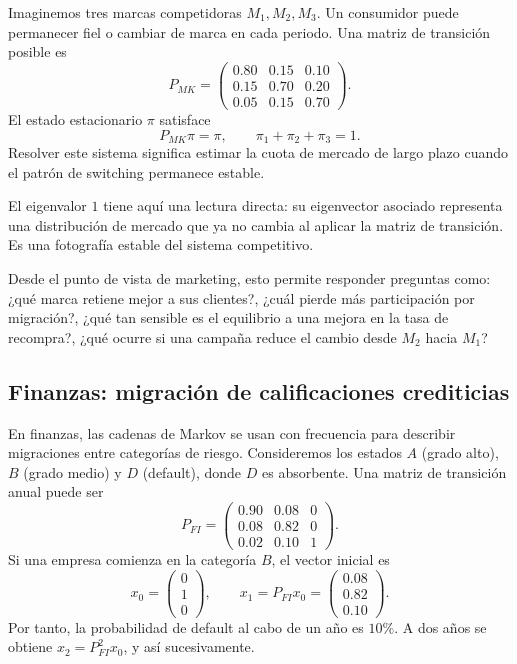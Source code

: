 \documentclass[10pt,a4paper,oneside]{article}
\theoremstyle{plain}
\theoremstyle{definition}
\theoremstyle{remark}
\begin{document}
Imaginemos tres marcas competidoras \(M_1,M_2,M_3\). Un consumidor puede permanecer fiel o cambiar de marca en cada periodo. Una matriz de transición posible es
\[
P_{MK}=
\begin{pmatrix}
0.80 & 0.15 & 0.10\\
0.15 & 0.70 & 0.20\\
0.05 & 0.15 & 0.70
\end{pmatrix}.
\]
El estado estacionario \(\pi\) satisface
\[
P_{MK}\pi=\pi,
\qquad
\pi_1+\pi_2+\pi_3=1.
\]
Resolver este sistema significa estimar la cuota de mercado de largo plazo cuando el patrón de switching permanece estable.

\begin{intuitionBox}
El eigenvalor \(1\) tiene aquí una lectura directa: su eigenvector asociado representa una distribución de mercado que ya no cambia al aplicar la matriz de transición. Es una fotografía estable del sistema competitivo.
\end{intuitionBox}

Desde el punto de vista de marketing, esto permite responder preguntas como: ¿qué marca retiene mejor a sus clientes?, ¿cuál pierde más participación por migración?, ¿qué tan sensible es el equilibrio a una mejora en la tasa de recompra?, ¿qué ocurre si una campaña reduce el cambio desde \(M_2\) hacia \(M_1\)?

\subsection{Finanzas: migración de calificaciones crediticias}

En finanzas, las cadenas de Markov se usan con frecuencia para describir migraciones entre categorías de riesgo. Consideremos los estados \(A\) (grado alto), \(B\) (grado medio) y \(D\) (default), donde \(D\) es absorbente. Una matriz de transición anual puede ser
\[
P_{FI}=
\begin{pmatrix}
0.90 & 0.08 & 0\\
0.08 & 0.82 & 0\\
0.02 & 0.10 & 1
\end{pmatrix}.
\]
Si una empresa comienza en la categoría \(B\), el vector inicial es
\[
x_0=
\begin{pmatrix}
0\\1\\0
\end{pmatrix},
\qquad
x_1=P_{FI}x_0=
\begin{pmatrix}
0.08\\0.82\\0.10
\end{pmatrix}.
\]
Por tanto, la probabilidad de default al cabo de un año es \(10\%\). A dos años se obtiene \(x_2=P_{FI}^2x_0\), y así sucesivamente.
\end{document}
